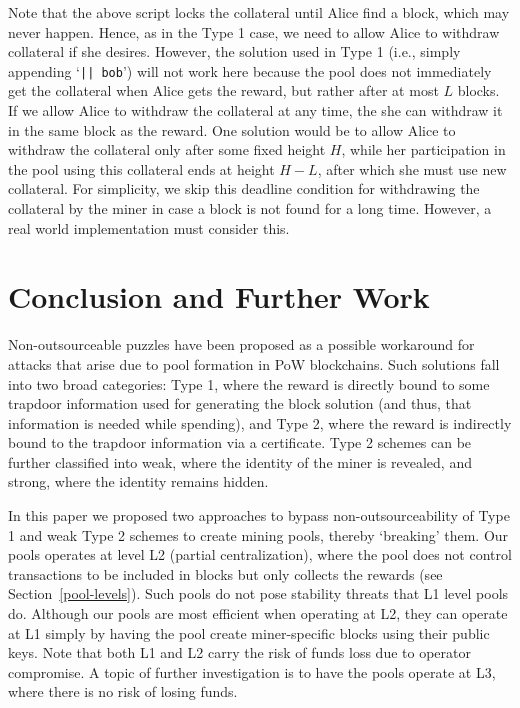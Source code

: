 \documentclass[runningheads]{llncs}
\begin{document}
Note that the above script locks the collateral until Alice find a block, which may never happen. Hence, as in the Type 1 case, we need to allow Alice to withdraw collateral if she desires. However, the solution used in Type 1 (i.e., simply appending `\texttt{|| bob}') will not work here because the pool does not immediately get the collateral when Alice gets the reward, but rather after at most $L$ blocks. If we allow Alice to withdraw the collateral at any time, the she can withdraw it in the same block as the reward.
One solution would be to allow Alice to withdraw the collateral only after some fixed height $H$, while her participation in the pool using this collateral ends at height $H - L$, after which she must use new collateral. For simplicity, we skip this deadline condition for withdrawing the collateral by the miner in case a block is not found for a long time. However, a real world implementation must consider this.

\section{Conclusion and Further Work}
\label{conclusion}

Non-outsourceable puzzles have been proposed as a possible workaround for attacks that arise due to pool formation in PoW blockchains. Such solutions fall into two broad categories: Type 1, where the reward is directly bound to some trapdoor information used for generating the block solution (and thus, that information is needed while spending), and Type 2, where the reward is indirectly bound to the trapdoor information via a certificate. Type 2 schemes can be further classified into weak, where the identity of the miner is revealed, and strong, where the identity remains hidden. 

In this paper we proposed two approaches to bypass non-outsourceability of Type 1 and weak Type 2
schemes to create mining pools, thereby `breaking' them. Our pools operates at level L2 (partial centralization), where the pool does not  control transactions to be included in blocks but only collects the rewards (see Section~\ref{pool-levels}). Such pools do not pose stability threats that L1 level pools do. Although our pools are most efficient when operating at L2, they can operate at L1 simply by having the pool create miner-specific blocks using their public keys. 
Note that both L1 and L2 carry the risk of funds loss due to operator compromise. A topic of further investigation is to have the pools operate at L3, where there is no risk of losing funds. 
\end{document}

